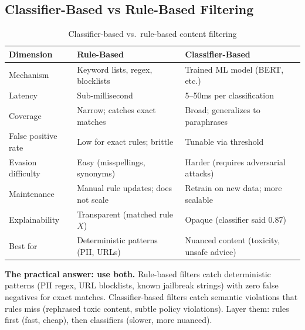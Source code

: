 \subsection{Classifier-Based vs Rule-Based Filtering}

\begin{table}[H]
\centering
\caption{Classifier-based vs.\ rule-based content filtering}
\begin{tabularx}{\textwidth}{lXX}
\toprule
\textbf{Dimension} & \textbf{Rule-Based} & \textbf{Classifier-Based} \\
\midrule
Mechanism & Keyword lists, regex, blocklists & Trained ML model (BERT, etc.) \\
Latency & Sub-millisecond & 5--50ms per classification \\
Coverage & Narrow; catches exact matches & Broad; generalizes to paraphrases \\
False positive rate & Low for exact rules; brittle & Tunable via threshold \\
Evasion difficulty & Easy (misspellings, synonyms) & Harder (requires adversarial attacks) \\
Maintenance & Manual rule updates; does not scale & Retrain on new data; more scalable \\
Explainability & Transparent (matched rule $X$) & Opaque (classifier said 0.87) \\
Best for & Deterministic patterns (PII, URLs) & Nuanced content (toxicity, unsafe advice) \\
\bottomrule
\end{tabularx}
\end{table}

\textbf{The practical answer: use both.} Rule-based filters catch deterministic patterns (PII regex, URL blocklists, known jailbreak strings) with zero false negatives for exact matches. Classifier-based filters catch semantic violations that rules miss (rephrased toxic content, subtle policy violations). Layer them: rules first (fast, cheap), then classifiers (slower, more nuanced).

